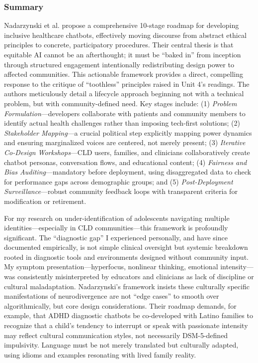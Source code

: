 \documentclass[11pt,twoside]{article}
\begin{document}
\vspace{-0.3cm}

\subsubsection*{Summary}

\vspace{-0.3cm}

Nadarzynski et al. propose a comprehensive 10-stage roadmap for developing inclusive healthcare chatbots, effectively moving discourse from abstract ethical principles to concrete, participatory procedures. Their central thesis is that equitable AI cannot be an afterthought; it must be ``baked in'' from inception through structured engagement intentionally redistributing design power to affected communities. This actionable framework provides a direct, compelling response to the critique of ``toothless'' principles raised in Unit 4's readings. The authors meticulously detail a lifecycle approach beginning not with a technical problem, but with community-defined need. Key stages include: (1) \textit{Problem Formulation}---developers collaborate with patients and community members to identify actual health challenges rather than imposing tech-first solutions; (2) \textit{Stakeholder Mapping}---a crucial political step explicitly mapping power dynamics and ensuring marginalized voices are centered, not merely present; (3) \textit{Iterative Co-Design Workshops}---CLD users, families, and clinicians collaboratively create chatbot personas, conversation flows, and educational content; (4) \textit{Fairness and Bias Auditing}---mandatory before deployment, using disaggregated data to check for performance gaps across demographic groups; and (5) \textit{Post-Deployment Surveillance}---robust community feedback loops with transparent criteria for modification or retirement.

For my research on under-identification of adolescents navigating multiple identities---especially in CLD communities---this framework is profoundly significant. The ``diagnostic gap'' I experienced personally, and have since documented empirically, is not simple clinical oversight but systemic breakdown rooted in diagnostic tools and environments designed without community input. My symptom presentation---hyperfocus, nonlinear thinking, emotional intensity---was consistently misinterpreted by educators and clinicians as lack of discipline or cultural maladaptation. Nadarzynski's framework insists these culturally specific manifestations of neurodivergence are not ``edge cases'' to smooth over algorithmically, but core design considerations. Their roadmap demands, for example, that ADHD diagnostic chatbots be co-developed with Latino families to recognize that a child's tendency to interrupt or speak with passionate intensity may reflect cultural communication styles, not necessarily DSM-5-defined impulsivity. Language must be not merely translated but culturally adapted, using idioms and examples resonating with lived family reality.
\end{document}
